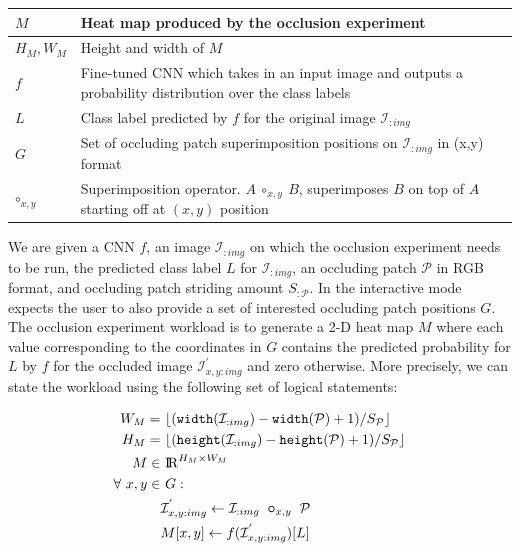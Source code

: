 \begin{table}[t]
{\begin{tabular}{p{2cm}p{7.5cm}}
    $M$ & Heat map produced by the occlusion experiment\\
    \midrule
    $H_M,W_M$ & Height and width of $M$\\
    \midrule
    $f$ & Fine-tuned CNN which takes in an input image and outputs a probability distribution over the class labels\\
    \midrule
    $L$ & Class label predicted by $f$ for the original image $\mathcal{I}_{:img}$\\
    \midrule
    $G$ & Set of occluding patch superimposition positions on $\mathcal{I}_{:img}$ in (x,y) format\\
    \midrule
    $\bm\circ_{x,y}$ & Superimposition operator. $A~\circ_{x,y}~B$, superimposes $B$ on top of $A$ starting off at $(x,y)$ position\\
    \bottomrule
  \end{tabular}}
\label{table:preliminaries_symbols}
\end{table}

We are given a CNN $f$, an image $\mathcal{I}_{:img}$ on which the occlusion experiment needs to be run, the predicted class label $L$ for $\mathcal{I}_{:img}$, an occluding patch $\mathcal{P}$ in RGB format, and occluding patch striding amount $S_{:\mathcal{P}}$.
In the interactive mode \system~ expects the user to also provide a set of interested occluding patch positions $G$.
The occlusion experiment workload is to generate a 2-D heat map $M$ where each value corresponding to the coordinates in $G$ contains the predicted probability for $L$ by $f$ for the occluded image $\mathcal{I}^{'}_{x,y:img}$ and zero otherwise.
More precisely, we can state the workload using the following set of logical statements:

\begin{align}
\label{eqn:mheight}
W_M =&~ \lfloor(\texttt{width}(\mathcal{I}_{:img}) - \texttt{width}(\mathcal{P}) + 1)/S_\mathcal{P}\rfloor\\
\label{eqn:mwidth}
H_M =&~ \lfloor(\texttt{height}(\mathcal{I}_{:img}) - \texttt{height}(\mathcal{P}) + 1)/S_\mathcal{P}\rfloor\\
M \in&~ \mathcal{\rm I\!R}^{H_M \times W_M}\\
\forall~ x,y \in&~ G:\\
\label{eqn:patchimpose}
& \mathcal{I}^{'}_{x,y:img} \leftarrow \mathcal{I}_{:img} ~ \bm\circ_{x,y} ~ \mathcal{P} \\
\label{eqn:outputval}
& M[x,y] \leftarrow f(\mathcal{I}^{'}_{x,y:img})[L]
\end{align}


